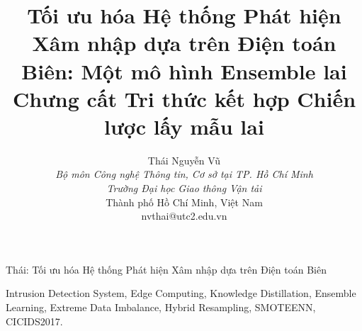 \documentclass[journal,10pt]{IEEEtran}
\begin{document}
\title{Tối ưu hóa Hệ thống Phát hiện Xâm nhập dựa trên Điện toán Biên: Một mô hình Ensemble lai Chưng cất Tri thức kết hợp Chiến lược lấy mẫu lai}

\author{Thái Nguyễn Vũ \\
\textit{Bộ môn Công nghệ Thông tin, Cơ sở tại TP. Hồ Chí Minh} \\
\textit{Trường Đại học Giao thông Vận tải} \\
Thành phố Hồ Chí Minh, Việt Nam \\
nvthai@utc2.edu.vn}
%
{Thái: Tối ưu hóa Hệ thống Phát hiện Xâm nhập dựa trên Điện toán Biên}

\maketitle



\begin{IEEEkeywords}
Intrusion Detection System, Edge Computing, Knowledge Distillation, Ensemble Learning, Extreme Data Imbalance, Hybrid Resampling, SMOTEENN, CICIDS2017.
\end{IEEEkeywords}










\end{document}
